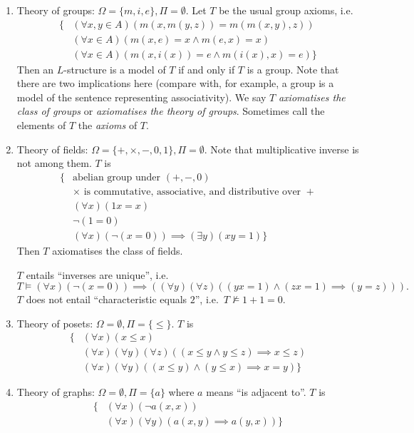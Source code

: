 \documentclass[a4paper]{article}
\begin{document}
\begin{eg}\leavevmode
  \begin{enumerate}
  \item Theory of groups: \(\Omega = \{m, i, e\}, \Pi = \emptyset\). Let \(T\) be the usual group axioms, i.e.
    \begin{align*}
      \{& (\forall x, y \in A) (m(x, m(y, z)) = m(m(x, y), z)) \\
      & (\forall x \in A) (m(x, e) = x \land m(e, x) = x) \\
      & (\forall x \in A) (m(x, i(x)) = e \land m(i(x), x) = e)\}
    \end{align*}
    Then an \(L\)-structure is a model of \(T\) if and only if \(T\) is a group. Note that there are two implications here (compare with, for example, a group is a model of the sentence representing associativity). We say \(T\) \emph{axiomatises the class of groups} or \emph{axiomatises the theory of groups}. Sometimes call the elements of \(T\) the \emph{axioms} of \(T\).
  \item Theory of fields: \(\Omega = \{+, \times, -, 0, 1\}, \Pi = \emptyset\). Note that multiplicative inverse is not among them. \(T\) is
    \begin{align*}
      \{& \text{abelian group under } (+, -, 0) \\
      & \times \text{ is commutative, associative, and distributive over } + \\
      & (\forall x) (1x = x) \\
      & \neg (1 = 0) \\
      & (\forall x) (\neg(x = 0)) \implies (\exists y)(xy = 1) \}
    \end{align*}
    Then \(T\) axiomatises the class of fields.

    \(T\) entails ``inverses are unique'', i.e.
    \[
      T \models (\forall x) (\neg (x = 0)) \implies ((\forall y) (\forall z) ((yx = 1) \land (zx = 1) \implies (y = z))).
    \]
    \(T\) does not entail ``characteristic equals \(2\)'', i.e.\ \(T \nvDash 1 + 1 = 0\).
  \item Theory of posets: \(\Omega = \emptyset, \Pi = \{\leq\}\). \(T\) is
    \begin{align*}
      \{& (\forall x) (x \leq x) \\
      & (\forall x) (\forall y) (\forall z) ((x \leq y \land y \leq z) \implies x \leq z) \\
      & (\forall x) (\forall y) ((x \leq y) \land (y \leq x) \implies x = y) \}
    \end{align*}
  \item Theory of graphs: \(\Omega = \emptyset, \Pi = \{a\}\) where \(a\) means ``is adjacent to''. \(T\) is
    \begin{align*}
      \{& (\forall x) (\neg a(x, x)) \\
      & (\forall x) (\forall y) (a(x, y) \implies a(y, x)) \}
    \end{align*}
  \end{enumerate}
\end{eg}
\end{document}

